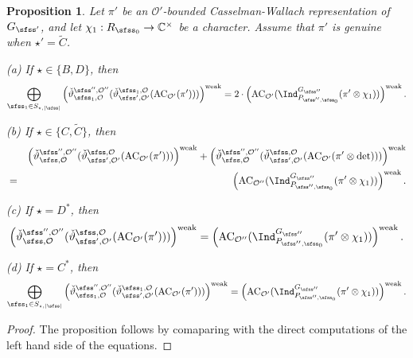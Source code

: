 \documentclass[12pt,a4paper]{amsart}
\def\abs#1{\left|{#1}\right|}
\newcommand{\CO}{{\mathcal {O}}}
\numberwithin{equation}{section}
\newtheorem{prop}[thm]{Proposition}
\theoremstyle{remark}
\begin{document}
\begin{prop}\label{prpaseq}
Let   $\pi'$ be an $\CO'$-bounded Casselman-Wallach representation of $G_{\sfss'}$, and let $\chi_1: R_{\sfss_0}\rightarrow \C^\times$ be a character.
Assume that $\pi'$ is genuine when $\star'=\widetilde C$.

\noindent
(a) If $ \star\in \{B,D\}$,  then
\[
    \bigoplus_{\sfss_1\in S_{\star, \abs{\sfss}}}  \left(\check \vartheta^{\sfss'', \CO''}_{\sfss_1, \CO}(\check \vartheta^{\sfss_1, \CO}_{\sfss',\CO'}(\mathrm{AC}_{\CO'}(\pi')))\right)^{\mathrm{weak}}=2\cdot \left( \mathrm{AC}_{\CO'}(\Ind_{P_{\sfss'',\sfss_0}}^{G_{\sfss''}} (\pi'\otimes \chi_1))\right)^{\mathrm{weak}}.
        \]

  \smallskip


    \noindent
(b) If $\star \in \{C, \widetilde C\}$, then
\begin{eqnarray*}
   && \left(\check \vartheta^{\sfss'', \CO''}_{\sfss, \CO}(\check \vartheta^{\sfss, \CO}_{\sfss',\CO'}(\mathrm{AC}_{\CO'}(\pi')))\right)^{\mathrm{weak}} +  \left(\check \vartheta^{\sfss'', \CO''}_{\sfss, \CO}(\check \vartheta^{\sfss, \CO}_{\sfss',\CO'}(\mathrm{AC}_{\CO'}(\pi'\otimes \det )))\right)^{\mathrm{weak}}\\
   & =&\left( \mathrm{AC}_{\CO''}(\Ind_{P_{\sfss'',\sfss_0}}^{G_{\sfss''}} (\pi'\otimes \chi_1))\right)^{\mathrm{weak}}.
\end{eqnarray*}
  \smallskip

\noindent
(c) If $\star=D^*$, then
\[
 \left(\check \vartheta^{\sfss'', \CO''}_{\sfss, \CO}(\check \vartheta^{\sfss, \CO}_{\sfss',\CO'}(\mathrm{AC}_{\CO'}(\pi')))\right)^{\mathrm{weak}} = \left( \mathrm{AC}_{\CO''}(\Ind_{P_{\sfss'',\sfss_0}}^{G_{\sfss''}} (\pi'\otimes \chi_1))\right)^{\mathrm{weak}}.
 \]

\smallskip

\noindent
(d) If $\star=C^*$, then
\[
  \bigoplus_{\sfss_1\in S_{\star, \abs{\sfss}} } \left(\check \vartheta^{\sfss'', \CO''}_{\sfss_1, \CO}(\check \vartheta^{\sfss_1, \CO}_{\sfss',\CO'}(\mathrm{AC}_{\CO'}(\pi')))\right)^{\mathrm{weak}}=\left( \mathrm{AC}_{\CO'}(\Ind_{P_{\sfss'',\sfss_0}}^{G_{\sfss''}} (\pi'\otimes \chi_1))\right)^{\mathrm{weak}}.
\]
\end{prop}
\begin{proof}
  The proposition follows by comaparing  with the direct computations of the left hand side of the equations.
\end{proof}
\end{document}
